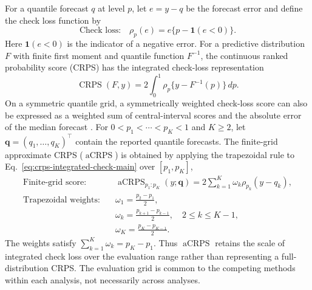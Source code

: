\documentclass[12pt,letterpaper]{article}
\numberwithin{equation}{section}
\newcommand{\ind}{\mathbf{1}}
\newcommand{\vect}[1]{\bm{#1}}
\newcommand{\aCRPS}{\operatorname{aCRPS}}
\begin{document}
For a quantile forecast \(q\) at level \(p\), let \(e=y-q\) be the forecast
error and define the check loss function by
\begin{equation}
\text{Check loss:}\quad \rho_p(e)=e\{p-\ind(e<0)\}.
\label{eq:check-loss-main}
\end{equation}
Here \(\ind(e<0)\) is the indicator of a negative error. For a predictive
distribution \(F\) with finite first moment and quantile function \(F^{-1}\),
the continuous ranked probability score (CRPS) has the integrated check-loss
representation
\citep{GneitingRaftery2007}
\begin{equation}
\operatorname{CRPS}(F,y)
=2\int_0^1\rho_p\{y-F^{-1}(p)\}\,dp.
\label{eq:crps-integrated-check-main}
\end{equation}
On a symmetric quantile grid, a symmetrically weighted check-loss score
can also be expressed as a weighted sum of central-interval scores and the
absolute error of the median forecast \citep{BracherEtAl2021WIS}.
For \(0<p_1<\cdots<p_K<1\) and \(K\geq2\), let
\(\vect q=(q_1,\ldots,q_K)^\top\) contain the reported quantile forecasts.
The finite-grid approximate
CRPS (\(\aCRPS\)) is obtained by applying the trapezoidal rule to
Eq.~\eqref{eq:crps-integrated-check-main} over \([p_1,p_K]\),
\begin{equation}
\begin{aligned}
\text{Finite-grid score:}\quad
&\aCRPS_{p_1:p_K}(y;\vect q)
 =2\sum_{k=1}^K\omega_k\rho_{p_k}(y-q_k),\\
\text{Trapezoidal weights:}\quad
&\omega_1=\frac{p_2-p_1}{2},\\
&\omega_k=\frac{p_{k+1}-p_{k-1}}{2},\quad 2\leq k\leq K-1,\\
&\omega_K=\frac{p_K-p_{K-1}}{2}.
\end{aligned}
\label{eq:acrps-main}
\end{equation}
The weights satisfy
\(\sum_{k=1}^K\omega_k=p_K-p_1\). Thus \(\aCRPS\) retains the scale of integrated
check loss over the evaluation range rather than representing a full-distribution
CRPS. The evaluation grid is common to the competing methods within each
analysis, not necessarily across analyses.
\end{document}
